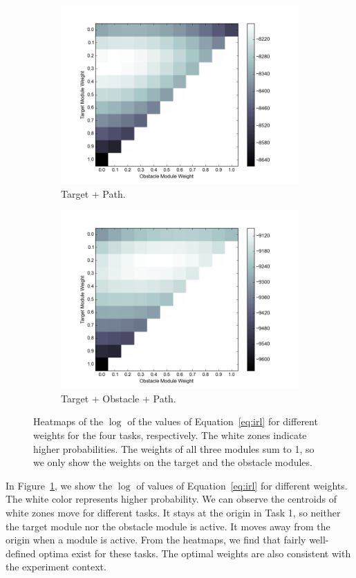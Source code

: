 \begin{figure}[h]
\begin{subfigure}[b]{0.4\textwidth}
\includegraphics[width=\textwidth]{objValuesTask3.png}
\caption{Target + Path. }
\end{subfigure}
\begin{subfigure}[b]{0.4\textwidth}
\includegraphics[width=\textwidth]{objValuesTask4.png}
\caption{Target + Obstacle + Path. }
\end{subfigure}
\caption{Heatmaps of the $\log$ of the values of Equation~\ref{eq:irl} for
different weights for the four tasks, respectively. The white zones indicate
higher probabilities. The weights of all three modules sum to 1, so we only show
the weights on the target and the obstacle modules.
}
\label{fig:heatmap}
\end{figure}

In Figure~\ref{fig:heatmap}, we show the $\log$ of values of
Equation~\ref{eq:irl} for different weights. The white color represents higher
probability. We can observe the centroids of white zones move for different
tasks. It stays at the origin in Task 1, so neither the target module nor the
obstacle module is active. It moves away from the origin when a module is
active.  From the heatmaps, we find that fairly well-defined optima exist for
these tasks. The optimal weights are also consistent with the experiment
context.


